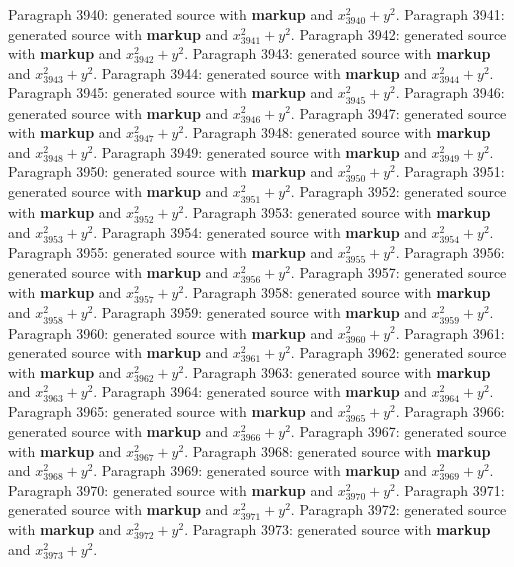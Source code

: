 \documentclass{article}
\begin{document}
Paragraph 3940: generated source with \textbf{markup} and $x_{3940}^2 + y^2$.
Paragraph 3941: generated source with \textbf{markup} and $x_{3941}^2 + y^2$.
Paragraph 3942: generated source with \textbf{markup} and $x_{3942}^2 + y^2$.
Paragraph 3943: generated source with \textbf{markup} and $x_{3943}^2 + y^2$.
Paragraph 3944: generated source with \textbf{markup} and $x_{3944}^2 + y^2$.
Paragraph 3945: generated source with \textbf{markup} and $x_{3945}^2 + y^2$.
Paragraph 3946: generated source with \textbf{markup} and $x_{3946}^2 + y^2$.
Paragraph 3947: generated source with \textbf{markup} and $x_{3947}^2 + y^2$.
Paragraph 3948: generated source with \textbf{markup} and $x_{3948}^2 + y^2$.
Paragraph 3949: generated source with \textbf{markup} and $x_{3949}^2 + y^2$.
Paragraph 3950: generated source with \textbf{markup} and $x_{3950}^2 + y^2$.
Paragraph 3951: generated source with \textbf{markup} and $x_{3951}^2 + y^2$.
Paragraph 3952: generated source with \textbf{markup} and $x_{3952}^2 + y^2$.
Paragraph 3953: generated source with \textbf{markup} and $x_{3953}^2 + y^2$.
Paragraph 3954: generated source with \textbf{markup} and $x_{3954}^2 + y^2$.
Paragraph 3955: generated source with \textbf{markup} and $x_{3955}^2 + y^2$.
Paragraph 3956: generated source with \textbf{markup} and $x_{3956}^2 + y^2$.
Paragraph 3957: generated source with \textbf{markup} and $x_{3957}^2 + y^2$.
Paragraph 3958: generated source with \textbf{markup} and $x_{3958}^2 + y^2$.
Paragraph 3959: generated source with \textbf{markup} and $x_{3959}^2 + y^2$.
Paragraph 3960: generated source with \textbf{markup} and $x_{3960}^2 + y^2$.
Paragraph 3961: generated source with \textbf{markup} and $x_{3961}^2 + y^2$.
Paragraph 3962: generated source with \textbf{markup} and $x_{3962}^2 + y^2$.
Paragraph 3963: generated source with \textbf{markup} and $x_{3963}^2 + y^2$.
Paragraph 3964: generated source with \textbf{markup} and $x_{3964}^2 + y^2$.
Paragraph 3965: generated source with \textbf{markup} and $x_{3965}^2 + y^2$.
Paragraph 3966: generated source with \textbf{markup} and $x_{3966}^2 + y^2$.
Paragraph 3967: generated source with \textbf{markup} and $x_{3967}^2 + y^2$.
Paragraph 3968: generated source with \textbf{markup} and $x_{3968}^2 + y^2$.
Paragraph 3969: generated source with \textbf{markup} and $x_{3969}^2 + y^2$.
Paragraph 3970: generated source with \textbf{markup} and $x_{3970}^2 + y^2$.
Paragraph 3971: generated source with \textbf{markup} and $x_{3971}^2 + y^2$.
Paragraph 3972: generated source with \textbf{markup} and $x_{3972}^2 + y^2$.
Paragraph 3973: generated source with \textbf{markup} and $x_{3973}^2 + y^2$.
\end{document}
